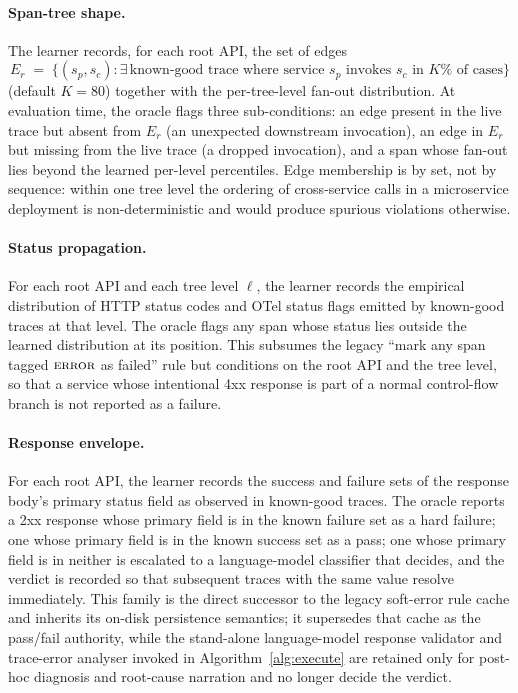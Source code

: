 \documentclass[conference]{IEEEtran}
\begin{document}
\paragraph{Span-tree shape.}
The learner records, for each root API, the set of edges
\[
  E_r \;=\; \big\{(s_p, s_c) : \exists\,\text{known-good trace where service } s_p \text{ invokes } s_c \text{ in } K\% \text{ of cases}\big\}
\]
(default $K{=}80$) together with the per-tree-level fan-out distribution. At evaluation time, the oracle flags three sub-conditions: an edge present in the live trace but absent from $E_r$ (an unexpected downstream invocation), an edge in $E_r$ but missing from the live trace (a dropped invocation), and a span whose fan-out lies beyond the learned per-level percentiles. Edge membership is by set, not by sequence: within one tree level the ordering of cross-service calls in a microservice deployment is non-deterministic and would produce spurious violations otherwise.

\paragraph{Status propagation.}
For each root API and each tree level $\ell$, the learner records the empirical distribution of HTTP status codes and OTel status flags emitted by known-good traces at that level. The oracle flags any span whose status lies outside the learned distribution at its position. This subsumes the legacy ``mark any span tagged $\textsc{error}$ as failed'' rule but conditions on the root API and the tree level, so that a service whose intentional 4xx response is part of a normal control-flow branch is not reported as a failure.

\paragraph{Response envelope.}
For each root API, the learner records the success and failure sets of the response body's primary status field as observed in known-good traces. The oracle reports a 2xx response whose primary field is in the known failure set as a hard failure; one whose primary field is in the known success set as a pass; one whose primary field is in neither is escalated to a language-model classifier that decides, and the verdict is recorded so that subsequent traces with the same value resolve immediately. This family is the direct successor to the legacy soft-error rule cache and inherits its on-disk persistence semantics; it supersedes that cache as the pass/fail authority, while the stand-alone language-model response validator and trace-error analyser invoked in Algorithm~\ref{alg:execute} are retained only for post-hoc diagnosis and root-cause narration and no longer decide the verdict.
\end{document}
